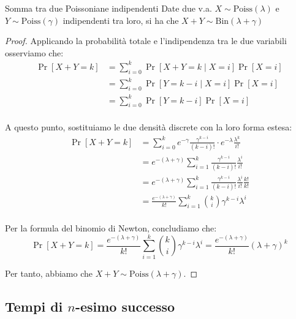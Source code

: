 \documentclass[a4paper, 12pt]{report}
\begin{document}
    \begin{framedprop}{Somma tra due Poissoniane indipendenti}
        Date due v.a. $X \sim \mathrm{Poiss}(\lambda)$ e $Y \sim \mathrm{Poiss}(\gamma)$ indipendenti tra loro, si ha che $X + Y \sim \mathrm{Bin}(\lambda + \gamma)$
    \end{framedprop}
    
    \begin{proof}
        Applicando la probabilità totale e l'indipendenza tra le due variabili osserviamo che:
        \[\begin{split}
            \Pr[X + Y = k] &= \sum_{i = 0}^{k} \Pr[X+Y = k \mid X = i] \Pr[X = i] \\
            &= \sum_{i = 0}^{k} \Pr[Y = k-i \mid X = i] \Pr[X = i] \\
            &= \sum_{i = 0}^{k} \Pr[Y = k-i] \Pr[X = i] \\
        \end{split}\]

        A questo punto, sostituiamo le due densità discrete con la loro forma estesa:
        \[\begin{split}
            \Pr[X+Y = k] &= \sum_{i = 0}^{k} e^{-\gamma} \frac{\gamma^{k-i}}{(k-i)!} \cdot e^{-\lambda} \frac{\lambda^{k}}{i!} \\
            &= e^{-(\lambda+\gamma)} \sum_{i = 1}^{k} \frac{\gamma^{k-i}}{(k-i)!} \frac{\lambda^{i}}{i!} \\
            &= e^{-(\lambda+\gamma)} \sum_{i = 1}^{k} \frac{\gamma^{k-i}}{(k-i)!} \frac{\lambda^{i}}{i!} \frac{k!}{k!} \\
            &= \frac{e^{-(\lambda+\gamma)}}{k!} \sum_{i = 1}^{k} \binom{k}{i} \gamma^{k-i} \lambda^i \\
        \end{split}\]

        Per la formula del binomio di Newton, concludiamo che:
        \[\Pr[X+Y = k] = \frac{e^{-(\lambda+\gamma)}}{k!} \sum_{i = 1}^{k} \binom{k}{i} \gamma^{k-i} \lambda^i = \frac{e^{-(\lambda+\gamma)}}{k!}(\lambda+\gamma)^k\]

        Per tanto, abbiamo che $X+Y \sim \mathrm{Poiss}(\lambda+\gamma)$.
    \end{proof}

    \newpage

    \subsection{Tempi di $n$-esimo successo}
\end{document}
